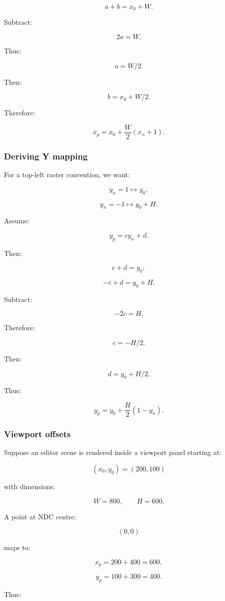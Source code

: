 \[
 a+b=x_0+W.
\]

Subtract:

\[
 2a=W.
\]

Thus:

\[
 a=W/2.
\]

Then:

\[
 b=x_0+W/2.
\]

Therefore:

\[
 \boxed{ x_p=x_0+\frac W2(x_n+1) }.
\]

\subsubsection{Deriving Y mapping}\label{deriving-y-mapping}

For a top-left raster convention, we want:

\[
 y_n=1\mapsto y_0,
\]

\[
 y_n=-1\mapsto y_0+H.
\]

Assume:

\[
 y_p=cy_n+d.
\]

Then:

\[
 c+d=y_0,
\]

\[
 -c+d=y_0+H.
\]

Subtract:

\[
 -2c=H.
\]

Therefore:

\[
 c=-H/2.
\]

Then:

\[
 d=y_0+H/2.
\]

Thus:

\[
 \boxed{ y_p=y_0+\frac H2(1-y_n) }.
\]

\subsubsection{Viewport offsets}\label{viewport-offsets}

Suppose an editor scene is rendered inside a viewport panel starting at:

\[
 (x_0,y_0)=(200,100)
\]

with dimensions:

\[
 W=800,\qquad H=600.
\]

A point at NDC centre:

\[
 (0,0)
\]

maps to:

\[
 x_p=200+400=600,
\]

\[
 y_p=100+300=400.
\]

Thus:

